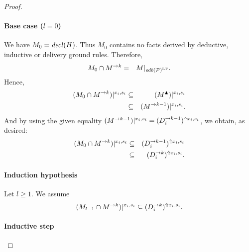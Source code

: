 \documentclass{tlp}
\newcommand{\ded}{\mathcal{P}}
\newcommand{\proj}[2]{#1|_{#2}}
\newcommand{\edb}[1]{\fname{edb}(#1)}
\newcommand{\sh}[1]{(#1)}
\newcommand{\toloct}[1]{#1^{\mathrm{LT}}}
\newcommand{\addlt}[3]{#1^{\Uparrow#2,#3}}
\newcommand{\projlt}[3]{#1|^{#2,#3}}
\newcommand{\shprojlt}[3]{\projlt{\sh{#1}}{#2}{#3}}
\newcommand{\shaddlt}[3]{\addlt{\sh{#1}}{#2}{#3}}
\newcommand{\decl}[1]{\fname{decl}(#1)}
\begin{document}
\begin{appendix}
\begin{proof}
\paragraph{Base case ($l=0$)}

We have $M_{0}=\decl H$. Thus $M_{0}$ contains no facts derived
by deductive, inductive or delivery ground rules. Therefore,
\begin{eqnarray*}
M_{0}\cap\strat Mk & = & \proj M{\toloct{\edb{\ded}}}.
\end{eqnarray*}
Hence, 
\begin{eqnarray*}
\shprojlt{M_{0}\cap\strat Mk}{x_{i}}{s_{i}} & \subseteq & \shprojlt{\up M}{x_{i}}{s_{i}}\\
 & \subseteq & \shprojlt{\strat M{k-1}}{x_{i}}{s_{i}}.
\end{eqnarray*}
And by using the given equality $\shprojlt{\strat M{k-1}}{x_{i}}{s_{i}}=\shaddlt{\strat{D_{i}}{k-1}}{x_{i}}{s_{i}}$,
we obtain, as desired:
\begin{eqnarray*}
\shprojlt{M_{0}\cap\strat Mk}{x_{i}}{s_{i}} & \subseteq & \shaddlt{\strat{D_{i}}{k-1}}{x_{i}}{s_{i}}\\
 & \subseteq & \shaddlt{\strat{D_{i}}k}{x_{i}}{s_{i}}.
\end{eqnarray*}



\paragraph*{Induction hypothesis}

Let $l\geq1$. We assume
\[
\shprojlt{M_{l-1}\cap\strat Mk}{x_{i}}{s_{i}}\subseteq\shaddlt{\strat{D_{i}}k}{x_{i}}{s_{i}}.
\]



\paragraph*{Inductive step}


\end{proof}
\end{appendix}
\end{document}
